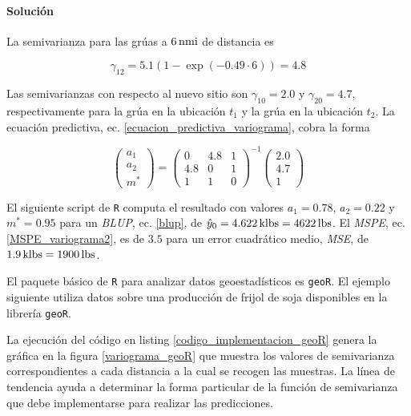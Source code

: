 \documentclass[14pt]{extarticle}
\begin{document}
\paragraph{Solución}
La semivarianza para las grúas a $\unit[6]{nmi}$ de distancia es

$$\gamma_{12} = 5.1(1 - \exp(-0.49\cdot6)) = 4.8$$

Las semivarianzas con respecto al nuevo sitio son $\gamma_{10} = 2.0$ y $\gamma_{20} = 4.7$, respectivamente para la grúa en la ubicación $t_1$ y la grúa en la ubicación $t_2$. La ecuación predictiva, ec. \ref{ecuacion_predictiva_variograma}, cobra la forma

\begin{equation}
	\begin{pmatrix}
	a_1 \\ a_2 \\ m^*
	\end{pmatrix} = \begin{pmatrix}
	0 & 4.8 & 1 \\
	4.8 & 0 & 1 \\
	1 & 1 & 0
	\end{pmatrix}^{-1} \begin{pmatrix}
	2.0 \\ 4.7 \\ 1
	\end{pmatrix}
\end{equation} 

El siguiente script de \verb|R| computa el resultado con valores $a_1 = 0.78$, $a_2 = 0.22$ y $m^* = 0.95$ para un \textit{BLUP}, ec. \ref{blup}, de $\hat{y}_0 = \unit[4.622]{klbs} = \unit[4622]{lbs}$. El \textit{MSPE}, ec. \ref{MSPE_variograma2}, es de $3.5$ para un error cuadrático medio, \textit{MSE}, de $\unit[1.9]{klbs} = \unit[1900]{lbs}$.



El paquete básico de \verb|R| para analizar datos geoestadísticos es \verb|geoR|. El ejemplo siguiente utiliza datos sobre una producción de frijol de soja disponibles en la librería \verb|geoR|. 



La ejecución del código en listing \ref{codigo_implementacion_geoR} genera la gráfica en la figura \ref{variograma_geoR} que muestra los valores de semivarianza correspondientes a cada distancia a la cual se recogen las muestras. La línea de tendencia ayuda a determinar la forma particular de la función de semivarianza que debe implementarse para realizar las predicciones. 
\end{document}
